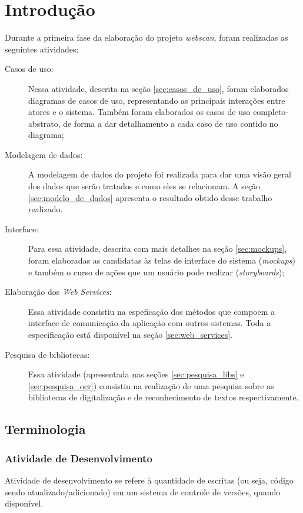 \section{Introdução}
\label{sec:intro}

Durante a primeira fase da elaboração do projeto {\it webscan}, foram realizadas as seguintes atividades:

\begin{description}
    \item[Casos de uso: ] Nessa atividade, descrita na seção \ref{sec:casos_de_uso}, foram elaborados diagramas de casos de uso, representando as principais interações entre atores e o sistema. Também foram elaborados os casos de uso completo-abstrato, de forma a dar detalhamento a cada caso de uso contido no diagrama;
    \item[Modelagem de dados: ] A modelagem de dados do projeto foi realizada para dar uma visão geral dos dados que serão tratados e como eles se relacionam. A seção \ref{sec:modelo_de_dados} apresenta o resultado obtido desse trabalho realizado. 
    \item[Interface: ] Para essa atividade, descrita com mais detalhes na seção \ref{sec:mockups}, foram elaboradas as candidatas às telas de interface do sistema ({\it mockups}) e também o curso de ações que um usuário pode realizar ({\it storyboards});
    \item[Elaboração dos {\it Web Services}: ] Essa atividade consistiu na
        espeficação dos métodos que compoem a interface de comunicação da
        aplicação com outros sistemas. Toda a especificação está disponível
        na seção \ref{sec:web_services}. 
    \item[Pesquisa de bibliotecas: ] Essa atividade (apresentada nas seções \ref{sec:pesquisa_libs} e \ref{sec:pesquisa_ocr}) consistiu na realização de uma pesquisa sobre as bibliotecas de digitalização e de reconhecimento de textos respectivamente.

\end{description}

\subsection{Terminologia}

\subsubsection{Atividade de Desenvolvimento}
Atividade de desenvolvimento se refere à quantidade de escritas (ou seja, código sendo atualizado/adicionado) em um sistema de controle de versões, quando disponível.

